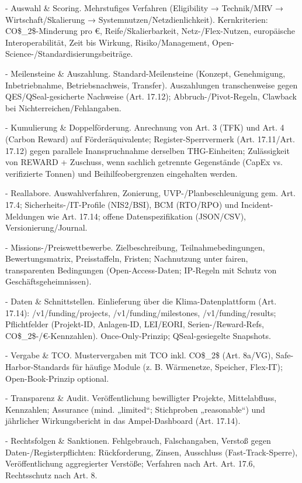 \documentclass[12pt,a4paper]{scrartcl}
\begin{document}
- Auswahl \& Scoring. Mehrstufiges Verfahren (Eligibility → Technik/MRV → Wirtschaft/Skalierung → Systemnutzen/Netzdienlichkeit). Kernkriterien: CO\$\_2\$-Minderung pro €, Reife/Skalierbarkeit, Netz-/Flex-Nutzen, europäische Interoperabilität, Zeit bis Wirkung, Risiko/Management, Open-Science-/Standardisierungsbeiträge.

- Meilensteine \& Auszahlung. Standard-Meilensteine (Konzept, Genehmigung, Inbetriebnahme, Betriebsnachweis, Transfer). Auszahlungen transchenweise gegen QES/QSeal-gesicherte Nachweise (Art. 17.12); Abbruch-/Pivot-Regeln, Clawback bei Nichterreichen/Fehlangaben.

- Kumulierung \& Doppelförderung. Anrechnung von Art. 3 (TFK) und Art. 4 (Carbon Reward) auf Förderäquivalente; Register-Sperrvermerk (Art. 17.11/Art. 17.12) gegen parallele Inanspruchnahme derselben THG-Einheiten; Zulässigkeit von REWARD + Zuschuss, wenn sachlich getrennte Gegenstände (CapEx vs. verifizierte Tonnen) und Beihilfeobergrenzen eingehalten werden.

- Reallabore. Auswahlverfahren, Zonierung, UVP-/Planbeschleunigung gem. Art. 17.4; Sicherheits-/IT-Profile (NIS2/BSI), BCM (RTO/RPO) und Incident-Meldungen wie Art. 17.14; offene Datenspezifikation (JSON/CSV), Versionierung/Journal.

- Missions-/Preiswettbewerbe. Zielbeschreibung, Teilnahmebedingungen, Bewertungsmatrix, Preisstaffeln, Fristen; Nachnutzung unter fairen, transparenten Bedingungen (Open-Access-Daten; IP-Regeln mit Schutz von Geschäftsgeheimnissen).

- Daten \& Schnittstellen. Einlieferung über die Klima-Datenplattform (Art. 17.14): /v1/funding/projects, /v1/funding/milestones, /v1/funding/results; Pflichtfelder (Projekt-ID, Anlagen-ID, LEI/EORI, Serien-/Reward-Refs, CO\$\_2\$-/€-Kennzahlen). Once-Only-Prinzip; QSeal-gesiegelte Snapshots.

- Vergabe \& TCO. Mustervergaben mit TCO inkl. CO\$\_2\$ (Art. 8a/VG), Safe-Harbor-Standards für häufige Module (z. B. Wärmenetze, Speicher, Flex-IT); Open-Book-Prinzip optional.

- Transparenz \& Audit. Veröffentlichung bewilligter Projekte, Mittelabfluss, Kennzahlen; Assurance (mind. „limited“; Stichproben „reasonable“) und jährlicher Wirkungsbericht in das Ampel-Dashboard (Art. 17.14).

- Rechtsfolgen \& Sanktionen. Fehlgebrauch, Falschangaben, Verstoß gegen Daten-/Registerpflichten: Rückforderung, Zinsen, Ausschluss (Fast-Track-Sperre), Veröffentlichung aggregierter Verstöße; Verfahren nach Art. Art. 17.6, Rechtsschutz nach Art. 8.
\end{document}

